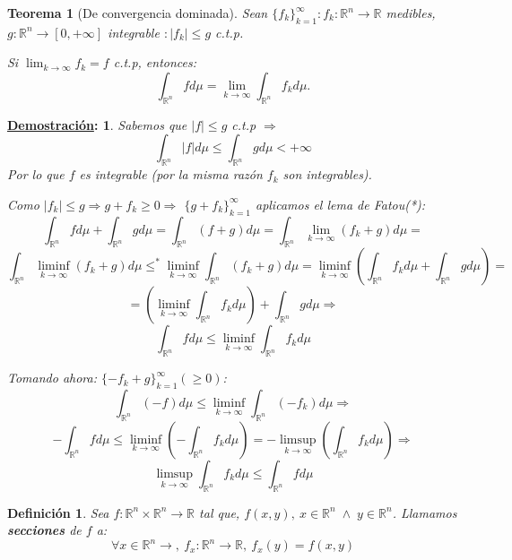 \documentclass[10pt,a4paper,openright]{book}
\theoremstyle{break}
\newtheorem*{defi}{Definición}
\newtheorem*{theo}{Teorema}
\newtheorem*{demo}{\underline{Demostración}:}
\newcommand{\dif}[1]{ d#1}
\begin{document}
\begin{theo}[De convergencia dominada]
Sean $\{f_k\}_{k=1}^{\infty}: f_k: \mathbb{R}^n \rightarrow \mathbb{R}$ medibles, $g: \mathbb{R}^n \rightarrow \left[0, +\infty\right]$ integrable $: \vert f_k \vert \le g$ c.t.p. 

Si $\lim_{k \rightarrow \infty}f_k = f $ c.t.p, entonces: 
$$\int_{\mathbb{R}^n} f \dif{\mu} = \lim_{k \rightarrow \infty} \int_{\mathbb{R}^n} f_k \dif{\mu}. $$
\end{theo}
\begin{demo}
Sabemos que $\vert f \vert \le g$ c.t.p $\Rightarrow$
$$\int_{\mathbb{R}^n} \vert f \vert \dif{\mu} \le \int_{\mathbb{R}^n} g \dif{\mu} < +\infty$$
Por lo que $f$ es integrable (por la misma razón $f_k$ son integrables).

Como $\vert f_k \vert \le g \Rightarrow g + f_k \ge 0 \Rightarrow$
$\{g + f_k\}_{k=1}^{\infty}$ aplicamos el lema de Fatou(*): 
$$\int_{\mathbb{R}^n} f \dif{\mu} + \int_{\mathbb{R}^n} g \dif{\mu} = \int_{\mathbb{R}^n} \left(f + g\right) \dif{\mu} = \int_{\mathbb{R}^n} \lim_{k \rightarrow \infty} \left(f_k + g\right)  \dif{\mu} =$$
$$\int_{\mathbb{R}^n} \liminf_{k \rightarrow \infty} \left(f_k + g\right)  \dif{\mu} \le^* \liminf_{k \rightarrow \infty}\int_{\mathbb{R}^n} \left(f_k + g\right) \dif{\mu} = \liminf_{k \rightarrow \infty} \left( \int_{\mathbb{R}^n} f_k \dif{\mu} + \int_{\mathbb{R}^n} g \dif{\mu} \right) =$$
$$ = \left(\liminf_{k \rightarrow \infty} \int_{\mathbb{R}^n} f_k \dif{\mu}  \right) + \int_{\mathbb{R}^n} g \dif{\mu} \Rightarrow$$
$$\int_{\mathbb{R}^n} f \dif{\mu} \le \liminf_{k \rightarrow \infty} \int_{\mathbb{R}^n} f_k \dif{\mu} $$

Tomando ahora: $\{-f_k + g\}_{k=1}^{\infty} \left(\ge 0\right)$:
$$\int_{\mathbb{R}^n} \left(-f\right) \dif{\mu} \le \liminf_{k \rightarrow \infty} \int_{\mathbb{R}^n} \left(-f_k\right) \dif{\mu} \Rightarrow $$
$$ - \int_{\mathbb{R}^n} f \dif{\mu} \le \liminf_{k \rightarrow \infty} \left(-\int_{\mathbb{R}^n} f_k \dif{\mu} \right) = -\limsup_{k \rightarrow \infty} \left(\int_{\mathbb{R}^n} f_k \dif{\mu} \right) \Rightarrow$$
$$\limsup_{k \rightarrow \infty} \int_{\mathbb{R}^n} f_k \dif{\mu} \le \int_{\mathbb{R}^n} f \dif{\mu} $$
\end{demo}

\begin{defi}
Sea $f: \mathbb{R}^{n} \times \mathbb{R}^n \rightarrow \mathbb{R}$ tal que, $f \left(x, y\right),\ x \in \mathbb{R}^n\; \land \;y \in \mathbb{R}^n$. Llamamos \textbf{secciones} de $f$ a:
$$\forall x \in \mathbb{R}^n \rightarrow,\ f_x: \mathbb{R}^n \rightarrow \mathbb{R},\ f_x \left(y\right) = f \left(x, y\right)$$
\end{defi}
\end{document}
